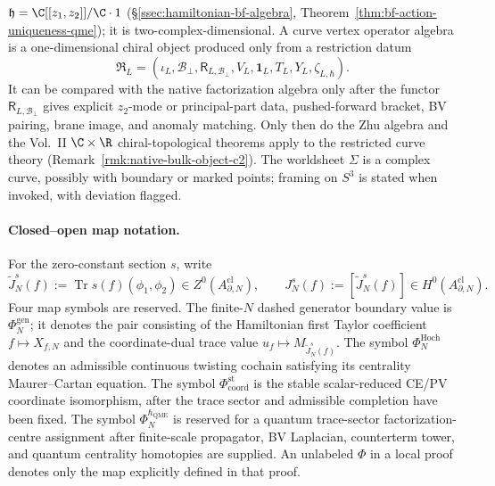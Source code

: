 \documentclass[11pt]{memoir}
\begin{document}
\(\mathfrak h=\C[[z_1,z_2]]/\C\cdot 1\)
(\S\ref{ssec:hamiltonian-bf-algebra},
Theorem~\ref{thm:bf-action-uniqueness-qme}); it is two-complex-dimensional.
A curve vertex operator algebra is a one-dimensional chiral object
produced only from a restriction datum
\[
  \mathfrak R_L
  =
  (\iota_L,\mathcal B_\perp,\mathsf R_{L,\mathcal B_\perp},
   V_L,\mathbf 1_L,T_L,Y_L,\zeta_{L,\hbar}) .
\]
It can be compared with the native factorization algebra only after
the functor \(\mathsf R_{L,\mathcal B_\perp}\) gives explicit
\(z_2\)-mode or principal-part data, pushed-forward bracket, BV
pairing, brane image, and anomaly matching.  Only then do the Zhu
algebra and the Vol.~II \(\C\times\R\) chiral-topological theorems
apply to the restricted curve theory
(Remark~\ref{rmk:native-bulk-object-c2}).
The worldsheet \(\Sigma\) is a complex curve, possibly with boundary
or marked points; framing on \(S^3\) is stated when invoked, with
deviation flagged.

\paragraph{Closed--open map notation.}
For the zero-constant section \(s\), write
\[
  \widetilde J_N^s(f)
    :=\operatorname{Tr}s(f)(\phi_1,\phi_2)
      \in Z^0(A^{\mathrm{cl}}_{\partial,N}),
  \qquad
  J_N^s(f):=[\widetilde J_N^s(f)]
      \in H^0(A^{\mathrm{cl}}_{\partial,N}).
\]
Four map symbols are reserved.  The finite-\(N\) dashed generator boundary
value is \(\Phi_N^{\mathrm{gen}}\); it denotes the pair consisting of
the Hamiltonian first Taylor coefficient
\(f\mapsto X_{f,N}\) and the coordinate-dual trace value
\(u_f\mapsto M_{\widetilde J_N^s(f)}\).  The symbol
\(\Phi_N^{\mathrm{Hoch}}\) denotes an admissible continuous twisting
cochain satisfying its centrality Maurer--Cartan equation.  The symbol
\(\Phi_{\mathrm{coord}}^{\mathrm{st}}\) is
the stable scalar-reduced CE/PV coordinate isomorphism, after the trace
sector and admissible completion have been fixed.  The symbol
\(\Phi_N^{\hbar_{\mathrm{QME}}}\) is reserved for a quantum
trace-sector factorization-centre assignment after finite-scale
propagator, BV Laplacian, counterterm tower, and quantum centrality
homotopies are supplied.  An unlabeled \(\Phi\) in a local proof denotes
only the map explicitly defined in that proof.
\end{document}
